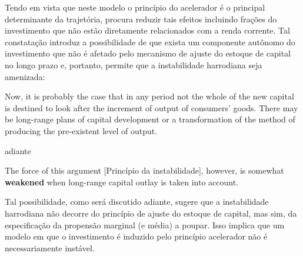 
Tendo em vista que neste modelo o princípio do acelerador é o principal determinante da trajetória, \textcite[p.~26--28]{harrod_essay_1939} procura reduzir tais efeitos incluindo frações do investimento que não estão diretamente relacionados com a renda corrente. Tal constatação introduz a possibilidade de que exista um componente autônomo do investimento que não é afetado pelo mecanismo de ajuste do estoque de capital no longo prazo e, portanto, permite que a instabilidade harrodiana seja amenizada:

\begin{citacao}
Now, it is probably the case that in any period not the whole of the new capital is destined to look after the increment of output of consumers' goods. There may be  long-range plans of capital development or a transformation  of the method of  producing  the pre-existent level of output. \cite[p.~17]{harrod_essay_1939}
\end{citacao}
adiante
\begin{citacao}
The force  of this  argument [Princípio da instabilidade], however, is somewhat \textbf{weakened} when long-range  capital outlay is taken into account.
\cite[p.~26, grifos adicionados]{harrod_essay_1939}
\end{citacao}
Tal possibilidade, como será discutido adiante, sugere que a instabilidade harrodiana não decorre do princípio de ajuste do estoque de capital, mas sim, da especificação da propensão marginal (e média) a poupar. Isso implica que um modelo em que o investimento é induzido pelo princípio acelerador não é necessariamente instável.

